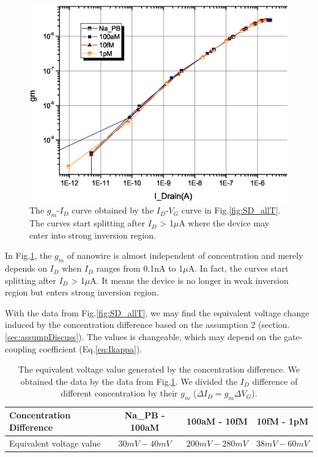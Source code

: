 \begin{figure}[htb]
    \includegraphics[width=1\textwidth]{images/chapter3/Id_Dev_bio.eps}
    \caption{The $g_m$-$I_D$ curve obtained by the $I_D$-$V_G$ curve in Fig.\ref{fig:SD_allT}. The curves start splitting after $I_D$ > 1$\mu$A where the device may enter into strong inversion region.}
    \label{fig:gmId}
\end{figure}

In Fig.\ref{fig:gmId}, the $g_m$ of nanowire is almost independent of concentration and merely depends on $I_D$ when $I_D$ ranges from 0.1nA to 1$\mu$A.
In fact, the curves start splitting after $I_D$ > 1$\mu$A.
It means the device is no longer in weak inversion region but enters strong inversion region.

With the data from Fig.\ref{fig:SD_allT}, we may find the equivalent voltage change induced by the concentration difference based on the assumption 2 (section.\ref{sec:assumpDiscuss}).
The values is changeable, which may depend on the gate-coupling coefficient (Eq.\ref{eq:Ikappa}).
\begin{table}[tbh]
    {\fontfamily{}\fontsize{10}{14}\selectfont
    \centering
    \begin{tabular}{l|c|c|c}
        Concentration Difference & Na\_PB - 100aM & 100aM - 10fM & 10fM - 1pM \\
        \hline
        Equivalent voltage value & $30mV - 40mV$ & $200mV - 280mV$ & $38mV - 60mV$ \\
    \end{tabular}
    \caption{The equivalent voltage value generated by the concentration difference. We obtained the data by the data from Fig.\ref{fig:gmId}. We divided the $I_D$ difference of different concentration by their $g_m$ ($\Delta I_D = g_m\Delta V_G$).}
    \label{tb:CdV}
    }
\end{table}










